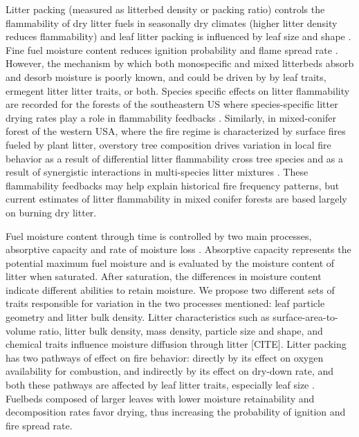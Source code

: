 \documentclass[fire,article,submit,moreauthors,pdftex]{Definitions/mdpi}
\begin{document}
Litter packing (measured as litterbed density or packing ratio) controls the flammability of dry litter fuels in seasonally dry climates (higher litter density reduces flammability) and leaf litter packing is influenced by leaf size and shape \cite{Fonda+Belanger+etal-1998, Kane+Varner+etal-2008, Schwilk+Caprio-2011, Kreye+Varner+etal-2013}. Fine fuel moisture content reduces ignition probability and flame spread rate \cite{Gisborne-1936, Fons-1946, Anderson+Rothermal-1965}. However, the mechanism by which both monospecific and mixed litterbeds absorb and desorb moisture is poorly known, and could be driven by by leaf traits, ermegent litter litter traits, or both. Species specific effects on litter flammability are recorded for the forests of the southeastern US \cite{Nowacki+Abrams-2008} where species-specific litter drying rates play a role in flammability feedbacks \cite{Kreye+Varner+etal-2013}. Similarly, in mixed-conifer forest of the western USA, where the fire regime is characterized by surface fires fueled by plant litter, overstory tree composition drives variation in local fire behavior \cite{Schwilk+Caprio-2011} as a result of differential litter flammability cross tree species and as a result of synergistic interactions in multi-species litter mixtures \cite{Magalhaes+Schwilk-2012}. These flammability feedbacks may help explain historical fire frequency patterns, but current estimates of litter flammability in mixed conifer forests are based largely on burning dry litter.

Fuel moisture content through time is controlled by two main processes, absorptive capacity and rate of moisture loss \citep{Kreye-2013}. Absorptive capacity represents the potential maximum fuel moisture and is evaluated by the moisture content of litter when saturated. After saturation, the differences in moisture content indicate different abilities to retain moisture. We propose two different sets of traits responsible for variation in the two processes mentioned: leaf particle geometry and litter bulk density. Litter characteristics such as surface-area-to-volume ratio, litter bulk density, mass density, particle size and shape, and chemical traits influence moisture diffusion through litter [CITE]. Litter packing has two pathways of effect on fire behavior: directly by its effect on oxygen availability for combustion, and indirectly by its effect on dry-down rate, and both these pathways are affected by leaf litter traits, especially leaf size \cite{Scarff+Westoby-2006}. Fuelbeds composed of larger leaves with lower moisture retainability and decomposition rates favor drying, thus increasing the probability of ignition and fire spread rate.
\end{document}
